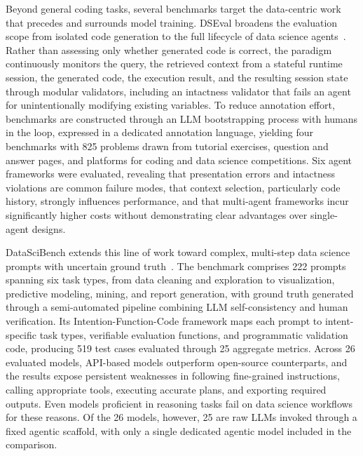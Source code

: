 \documentclass[
english,                 %
bibtex,                  %
]{kththesis}
\numberwithin{listing}{chapter}
\begin{document}
Beyond general coding tasks, several benchmarks target the data-centric work that precedes and surrounds model training. DS\Gls{Eval} broadens the evaluation scope from isolated code generation to the full lifecycle of data science agents~\cite{zhang_benchmarking_2024}. Rather than assessing only whether generated code is correct, the paradigm continuously monitors the query, the retrieved context from a stateful runtime session, the generated code, the execution result, and the resulting session state through modular validators, including an intactness validator that fails an agent for unintentionally modifying existing variables. To reduce annotation effort, benchmarks are constructed through an \gls{LLM} bootstrapping process with humans in the loop, expressed in a dedicated annotation language, yielding four benchmarks with 825 problems drawn from tutorial exercises, question and answer pages, and platforms for coding and data science competitions. Six agent frameworks were evaluated, revealing that presentation errors and intactness violations are common failure modes, that context selection, particularly code history, strongly influences performance, and that multi-agent frameworks incur significantly higher costs without demonstrating clear advantages over single-agent designs.

\gls{DataSciBench} extends this line of work toward complex, multi-step data science prompts with uncertain ground truth~\cite{zhang_datascibench_2026}. The benchmark comprises 222 prompts spanning six task types, from data cleaning and exploration to visualization, predictive modeling, mining, and report generation, with ground truth generated through a semi-automated pipeline combining \gls{LLM} self-consistency and human verification. Its Intention-Function-Code framework maps each prompt to intent-specific task types, verifiable evaluation functions, and programmatic validation code, producing 519 test cases evaluated through 25 aggregate metrics. Across 26 evaluated models, \gls{API}-based models outperform open-source counterparts, and the results expose persistent weaknesses in following fine-grained instructions, calling appropriate tools, executing accurate plans, and exporting required outputs. Even models proficient in reasoning tasks fail on data science workflows for these reasons. Of the 26 models, however, 25 are raw \glspl{LLM} invoked through a fixed agentic scaffold, with only a single dedicated agentic model included in the comparison.
\end{document}
